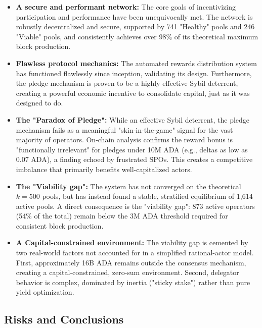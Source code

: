 \documentclass[11pt, letterpaper]{article}
\begin{document}
\begin{itemize}
    \item \textbf{A secure and performant network:} The core goals of incentivizing participation and 
    performance have been unequivocally met. The network is robustly decentralized and secure, supported by 741 
    "Healthy" pools and 246 "Viable" pools, and consistently achieves over 98\% of its theoretical maximum block 
    production.
    
    \item \textbf{Flawless protocol mechanics:} The automated rewards distribution system has functioned 
    flawlessly since inception, validating its design. Furthermore, the pledge mechanism is proven to be a 
    highly effective Sybil deterrent, creating a powerful economic incentive to consolidate capital, just as it 
    was designed to do.
    
    \item \textbf{The "Paradox of Pledge":} While an effective Sybil deterrent, the pledge mechanism 
    fails as a meaningful "skin-in-the-game" signal for the vast majority of operators. On-chain analysis 
    confirms the reward bonus is "functionally irrelevant" for pledges under 10M ADA (e.g., deltas as low 
    as 0.07 ADA), a finding echoed by frustrated SPOs. This creates a competitive imbalance that primarily 
    benefits well-capitalized actors.
    
    \item \textbf{The "Viability gap":} The system has not converged on the theoretical $k=500$ pools, but 
    has instead found a stable, stratified equilibrium of 1,614 active pools. A direct consequence is the 
    "viability gap": 873 active operators (54\% of the total) remain below the 3M ADA threshold required for 
    consistent block production.
    
    \item \textbf{A Capital-constrained environment:} The viability gap is cemented by two real-world factors 
    not accounted for in a simplified rational-actor model. First, approximately 16B ADA remains outside the 
    consensus mechanism, creating a capital-constrained, zero-sum environment. Second, delegator behavior is 
    complex, dominated by inertia ("sticky stake") rather than pure yield optimization.
\end{itemize}

\subsection*{Risks and Conclusions}
\end{document}

